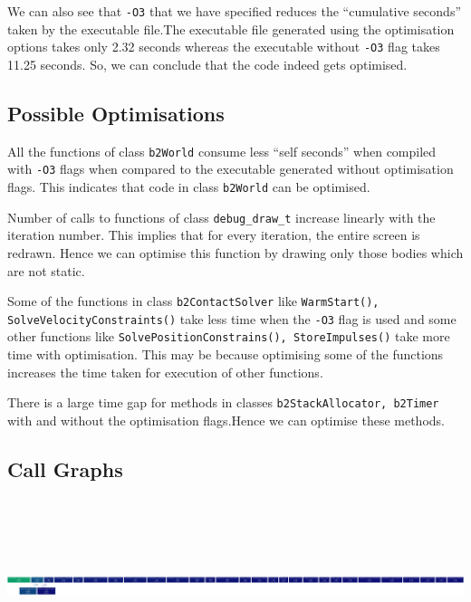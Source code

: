 \documentclass[11pt]{article}
\begin{document}
We can also see that {\tt -O3} that we have specified reduces the ``cumulative seconds'' taken by the executable file.The executable file generated using the optimisation options takes only 2.32 seconds whereas the executable  without {\tt -O3} flag takes 11.25 seconds. So, we can conclude that the code indeed gets optimised. 

\subsection{Possible Optimisations}
All the functions of class {\tt b2World} consume less ``self seconds'' when compiled with {\tt -O3} flags when compared to the executable generated without optimisation flags. This indicates that code in class {\tt b2World} can be optimised. 

Number of calls to functions of class {\tt debug\_draw\_t} increase linearly with the iteration number. This implies that for every iteration, the entire screen is redrawn. Hence we can optimise this function by drawing only those bodies which are not static.

Some of the functions in class {\tt b2ContactSolver} like {\tt WarmStart(), SolveVelocityConstraints()} take less time when the {\tt -O3} flag is used and some other functions like {\tt SolvePositionConstrains(), StoreImpulses()} take more time with optimisation. This may be because optimising some of the functions increases the time taken for execution of other functions.

There is a large time gap for methods in classes {\tt b2StackAllocator, b2Timer} with and without the optimisation flags.Hence we can optimise these methods.

\subsection{Call Graphs}

\includegraphics[width=8in,height=2in]{./release.png}
\end{document}
